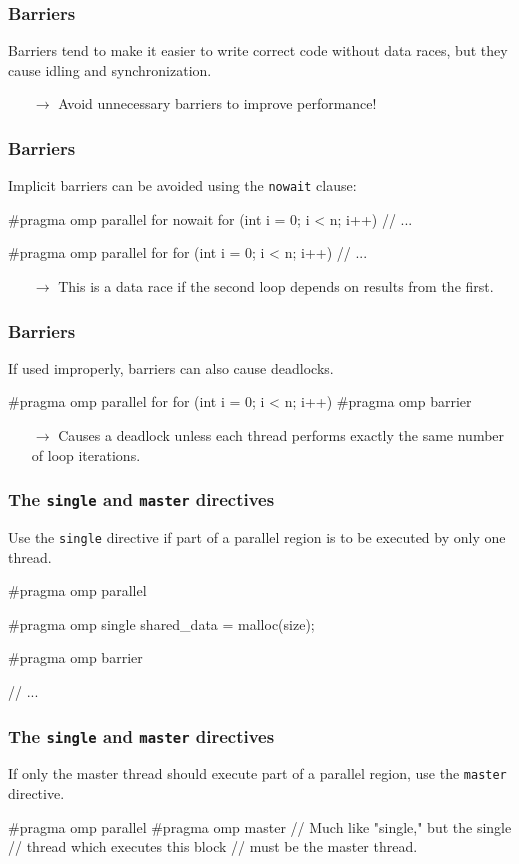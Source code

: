 \documentclass[12pt,t]{beamer}
\let\emph\relax %
\newcommand{\conclude}[1]{%
  \begin{itemize}
    \item[$\rightarrow$]#1
  \end{itemize}
}
\begin{document}
  \begin{frame}[fragile]
    \frametitle{Barriers}

    Barriers tend to make it easier to write correct code without data races, but they cause idling and synchronization.
    \conclude{Avoid unnecessary barriers to improve performance!}
  \end{frame}

  \begin{frame}[fragile]
    \frametitle{Barriers}

    Implicit barriers can be avoided using the \texttt{nowait} clause:
    \begin{code}
#pragma omp parallel for nowait
for (int i = 0; i < n; i++) {
  // ...
}

#pragma omp parallel for
for (int i = 0; i < n; i++) {
  // ...
}
    \end{code}
    \conclude{\emph{Caution:} This is a data race if the second loop depends on results from the first.}
  \end{frame}

  \begin{frame}[fragile]
    \frametitle{Barriers}

    If used improperly, barriers can also cause deadlocks.
    \begin{code}
#pragma omp parallel for
for (int i = 0; i < n; i++) {
  #pragma omp barrier
}
    \end{code}
    \conclude{Causes a deadlock unless each thread performs exactly the same number of loop iterations.}
  \end{frame}

  \begin{frame}[fragile]
    \frametitle{The \texttt{single} and \texttt{master} directives}

    Use the \texttt{single} directive if part of a parallel region is to be executed by only one thread.
    \begin{code}
#pragma omp parallel
{
  #pragma omp single
  {
    shared_data = malloc(size);
  }

  #pragma omp barrier

  // ...
}
    \end{code}
  \end{frame}

  \begin{frame}[fragile]
    \frametitle{The \texttt{single} and \texttt{master} directives}

    If only the master thread should execute part of a parallel region, use the \texttt{master} directive.
    \begin{code}
#pragma omp parallel
{
  #pragma omp master
  {
    // Much like "single," but the single
    // thread which executes this block
    // must be the master thread.
  }
}
    \end{code}
  \end{frame}
\end{document}
